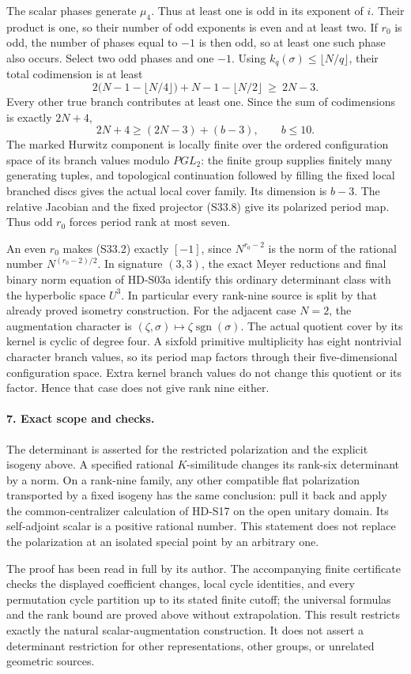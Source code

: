The scalar phases generate \(\mu_4\). Thus at least one is odd
in its exponent of \(i\). Their product is one, so their number
of odd exponents is even and at least two. If \(r_0\) is odd,
the number of phases equal to \(-1\) is then odd, so at least
one such phase also occurs. Select two odd phases and one \(-1\).
Using \(k_q(\sigma)\le\lfloor N/q\rfloor\), their total
codimension is at least
\[
 2\bigl(N-1-\lfloor N/4\rfloor\bigr)
   +N-1-\lfloor N/2\rfloor\ \ge\ 2N-3.
\]
Every other true branch contributes at least one. Since the sum
of codimensions is exactly \(2N+4\),
\[
 2N+4\ge(2N-3)+(b-3),\qquad b\le10.
 \tag{S33.12}
\]
The marked Hurwitz component is locally finite over the ordered
configuration space of its branch values modulo \(PGL_2\):
the finite group supplies finitely many generating tuples, and
topological continuation followed by filling the fixed local
branched discs gives the actual local cover family. Its dimension
is \(b-3\). The relative Jacobian and the fixed projector
(S33.8) give its polarized period map. Thus odd \(r_0\) forces
period rank at most seven.

An even \(r_0\) makes (S33.2) exactly \([-1]\), since
\(N^{r_0-2}\) is the norm of the rational number
\(N^{(r_0-2)/2}\). In signature \((3,3)\), the exact Meyer
reductions and final binary norm equation of HD-S03a identify this
ordinary determinant class with the hyperbolic space \(U^3\).
In particular every rank-nine source is split by that already
proved isometry construction.
For the adjacent case \(N=2\), the augmentation character is
\((\zeta,\sigma)\mapsto\zeta\operatorname{sgn}(\sigma)\).
The actual quotient cover by its kernel is cyclic of degree four.
A sixfold primitive multiplicity has eight nontrivial character
branch values, so its period map factors through their
five-dimensional configuration space. Extra kernel branch values
do not change this quotient or its factor. Hence that case does
not give rank nine either.

\paragraph{7. Exact scope and checks.}
The determinant is asserted for the restricted polarization and
the explicit isogeny above. A specified rational \(K\)-similitude
changes its rank-six determinant by a norm. On a rank-nine family,
any other compatible flat polarization transported by a fixed
isogeny has the same conclusion: pull it back and apply the
common-centralizer calculation of HD-S17 on the open unitary
domain. Its self-adjoint scalar is a positive rational number.
This statement does not replace the polarization at an isolated
special point by an arbitrary one.

The proof has been read in full by its author. The accompanying
finite certificate checks the displayed coefficient changes,
local cycle identities, and every permutation cycle partition up
to its stated finite cutoff; the universal formulas and the
rank bound are proved above without extrapolation. This result
restricts exactly the natural scalar-augmentation construction.
It does not assert a determinant restriction for other
representations, other groups, or unrelated geometric sources.
